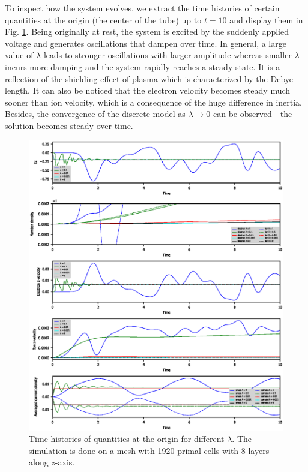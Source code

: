 \documentclass{article}
\begin{document}
To inspect how the system evolves, we extract the time histories of certain quantities at the origin (the center of the tube) up to $t = 10$ and display them in Fig. \ref{fig:origin-data_vs_time}. Being originally at rest, the system is excited by the suddenly applied voltage and generates oscillations that dampen over time. In general, a large value of $\lambda$ leads to stronger oscillations with larger amplitude whereas smaller $\lambda$ incurs more damping and the system rapidly reaches a steady state. It is a reflection of the shielding effect of plasma which is characterized by the Debye length. It can also be noticed that the electron velocity becomes steady much sooner than ion velocity, which is a consequence of the huge difference in inertia. Besides, the convergence of the discrete model as $\lambda \rightarrow 0$ can be observed---the solution becomes steady over time.
\begin{figure}
    \centering
    \includegraphics[scale=0.9]{origin_data-vs-time_withInsulator.eps}
    \caption{Time histories of quantities at the origin for different $\lambda$. The simulation is done on a mesh with 1920 primal cells with 8 layers along $z$-axis.}
    \label{fig:origin-data_vs_time}
\end{figure}
\end{document}
